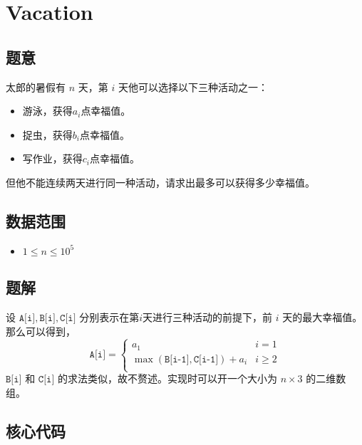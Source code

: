 \section{Vacation}
\subsection*{题意}
太郎的暑假有 $n$ 天，第  $i$ 天他可以选择以下三种活动之一：
\begin{itemize}
\item 游泳，获得$a_i$点幸福值。
\item 捉虫，获得$b_i$点幸福值。
\item 写作业，获得$c_i$点幸福值。
\end{itemize}
但他不能连续两天进行同一种活动，请求出最多可以获得多少幸福值。


\subsection*{数据范围}
\begin{itemize}
\item $1\le n\le 10^5$
\end{itemize}


\subsection*{题解}
设 ${\texttt{A[i]}},{\texttt{B[i]}},{\texttt{C[i]}}$ 分别表示在第$i$天进行三种活动的前提下，前 $i$ 天的最大幸福值。那么可以得到，
\begin{equation*}
{\texttt{A[i]}} = 
\begin{cases}
 a_1 & i = 1\\
\max({\texttt{B[i-1]}},{\texttt{C[i-1]}})+a_i & i \ge 2\\
\end{cases}
\end{equation*}
${\texttt{B[i]}}$ 和 ${\texttt{C[i]}}$ 的求法类似，故不赘述。实现时可以开一个大小为 $n \times 3$ 的二维数组。
\subsection*{核心代码}
\inputminted[linenos,autogobble]{cpp}{../Code/C.cpp}
\newpage